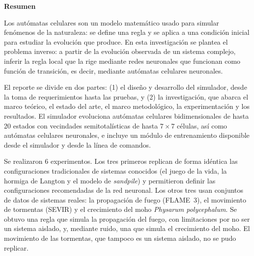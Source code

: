 \thispagestyle{empty}

\vspace*{1cm}
{\centering \Large \textbf{Resumen}\par}
\vspace{0.8cm}

Los autómatas celulares son un modelo matemático usado para simular fenómenos de la naturaleza: se define una regla y se aplica a una condición inicial para estudiar la evolución que produce. En esta investigación se plantea el problema inverso: a partir de la evolución observada de un sistema complejo, inferir la regla local que la rige mediante redes neuronales que funcionan como función de transición, es decir, mediante autómatas celulares neuronales.

El reporte se divide en dos partes: (1) el diseño y desarrollo del simulador, desde la toma de requerimientos hasta las pruebas, y (2) la investigación, que abarca el marco teórico, el estado del arte, el marco metodológico, la experimentación y los resultados. El simulador evoluciona autómatas celulares bidimensionales de hasta 20 estados con vecindades semitotalísticas de hasta $7 \times 7$ células, así como autómatas celulares neuronales, e incluye un módulo de entrenamiento disponible desde el simulador y desde la línea de comandos.

Se realizaron 6 experimentos. Los tres primeros replican de forma idéntica las configuraciones tradicionales de sistemas conocidos (el juego de la vida, la hormiga de Langton y el modelo de \textit{sandpile}) y permitieron definir las configuraciones recomendadas de la red neuronal. Los otros tres usan conjuntos de datos de sistemas reales: la propagación de fuego (FLAME~3), el movimiento de tormentas (SEVIR) y el crecimiento del moho \textit{Physarum polycephalum}. Se obtuvo una regla que simula la propagación del fuego, con limitaciones por no ser un sistema aislado, y, mediante ruido, una que simula el crecimiento del moho. El movimiento de las tormentas, que tampoco es un sistema aislado, no se pudo replicar.

\clearpage
